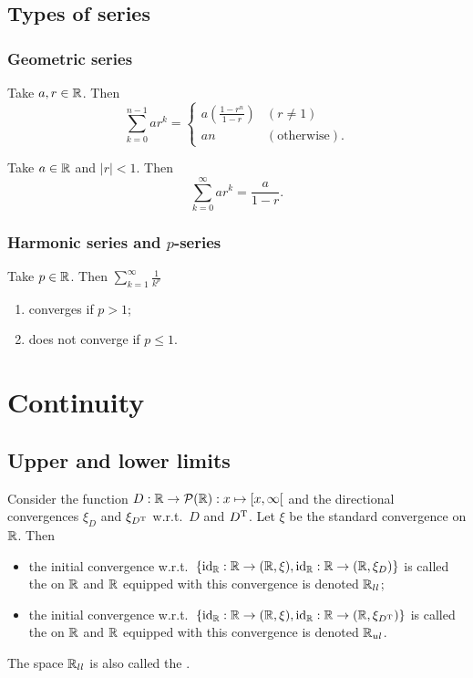 \subsection{Types of series}
\subsubsection{Geometric series}
\begin{proposition}
Take $a,r\in \mathbb{R}$. Then
\[ \sum_{k=0}^{n-1}ar^k = \begin{cases}
a\left(\frac{1-r^n}{1-r}\right) & (r\neq 1) \\
an & (\text{otherwise}).
\end{cases} \]
\end{proposition}
\begin{corollary}
Take $a\in \mathbb{R}$ and $|r|<1$. Then
\[ \sum_{k=0}^\infty a r^k = \frac{a}{1-r}. \]
\end{corollary}

\subsubsection{Harmonic series and $p$-series}
\begin{proposition} \label{pseriesConvergence}
Take $p\in \mathbb{R}$. Then $\sum_{k=1}^\infty \frac{1}{k^p}$
\begin{enumerate}
\item converges if $p > 1$;
\item does not converge if $p\leq 1$.
\end{enumerate}
\end{proposition}



\section{Continuity}

\subsection{Upper and lower limits}
\begin{definition}
Consider the function $D: \R \to\powerset(\R): x\mapsto \interval[co]{x,\infty}$ and the directional convergences $\xi_D$ and $\xi_{D^{\mathrm{T}}}$ w.r.t.\ $D$ and $D^{\mathrm{T}}$. Let $\xi$ be the standard convergence on $\mathbb{R}$.
Then
\begin{itemize}
\item the initial convergence w.r.t.\ $\{\id_\R: \R\to \sSet{\R,\xi}, \id_\R: \R\to \sSet{\R,\xi_D}\}$ is called the  on $\mathbb{R}$ and $\mathbb{R}$ equipped with this convergence is denoted $\mathbb{R}_{ll}$;
\item the initial convergence w.r.t.\ $\{\id_\R: \R\to \sSet{\R,\xi}, \id_\R: \R\to \sSet{\R,\xi_{D^\transp}}\}$ is called the  on $\mathbb{R}$ and $\mathbb{R}$ equipped with this convergence is denoted $\mathbb{R}_{ul}$.
\end{itemize}
The space $\mathbb{R}_{ll}$ is also called the .
\end{definition}

